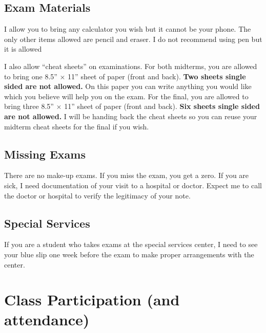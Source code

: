 \documentclass[12pt]{article}
\newcommand{\inred}[1]{\color{red}\textbf{#1} \color{black}}
\newcommand{\qu}[1]{``#1''}
\begin{document}
\subsection*{Exam Materials}

I allow you to bring any calculator you wish but it cannot be your phone. The only other items allowed are pencil and eraser. I do not recommend using pen but it is allowed

I also allow \qu{cheat sheets} on examinations. For both midterms, you are allowed to bring one 8.5'' $\times$ 11'' sheet of paper (front and back). \inred{Two sheets single sided are not allowed.} On this paper you can write anything you would like which you believe will help you on the exam. For the final, you are allowed to bring three 8.5'' $\times$ 11'' sheet of paper (front and back). \inred{Six sheets single sided are not allowed.} I will be handing back the cheat sheets so you can reuse your midterm cheat sheets for the final if you wish. 

%
%


\subsection*{Missing Exams}

There are no make-up exams. If you miss the exam, you get a zero. If you are sick, I need documentation of your visit to a hospital or doctor. Expect me to call the doctor or hospital to verify the legitimacy of your note. %

\subsection*{Special Services}

If you are a student who takes exams at the special services center, I need to see your blue slip one week before the exam to make proper arrangements with the center.

\section*{Class Participation (and attendance)}
\end{document}
